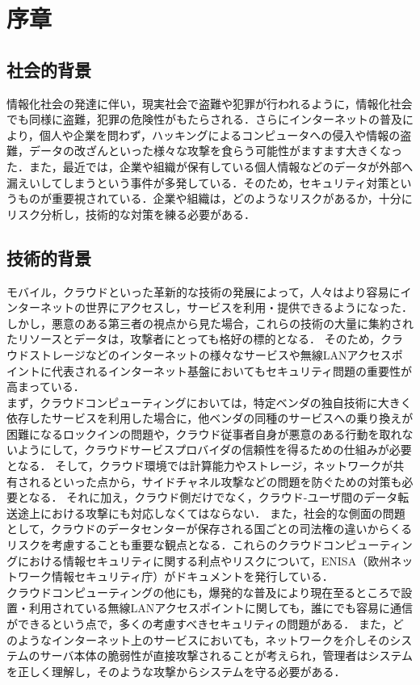 \chapter{序章}

\section{社会的背景}
情報化社会の発達に伴い，現実社会で盗難や犯罪が行われるように，情報化社会でも同様に盗難，犯罪の危険性がもたらされる．さらにインターネットの普及により，個人や企業を問わず，ハッキングによるコンピュータへの侵入や情報の盗難，データの改ざんといった様々な攻撃を食らう可能性がますます大きくなった．また，最近では，企業や組織が保有している個人情報などのデータが外部へ漏えいしてしまうという事件が多発している．そのため，セキュリティ対策というものが重要視されている．企業や組織は，どのようなリスクがあるか，十分にリスク分析し，技術的な対策を練る必要がある．

\section{技術的背景}
モバイル，クラウドといった革新的な技術の発展によって，人々はより容易にインターネットの世界にアクセスし，サービスを利用・提供できるようになった．
しかし，悪意のある第三者の視点から見た場合，これらの技術の大量に集約されたリソースとデータは，攻撃者にとっても格好の標的となる．
そのため，クラウドストレージなどのインターネットの様々なサービスや無線LANアクセスポイントに代表されるインターネット基盤においてもセキュリティ問題の重要性が高まっている．\\
まず，クラウドコンピューティングにおいては，特定ベンダの独自技術に大きく依存したサービスを利用した場合に，他ベンダの同種のサービスへの乗り換えが困難になるロックインの問題や，クラウド従事者自身が悪意のある行動を取れないようにして，クラウドサービスプロバイダの信頼性を得るための仕組みが必要となる．
そして，クラウド環境では計算能力やストレージ，ネットワークが共有されるといった点から，サイドチャネル攻撃などの問題を防ぐための対策も必要となる．
それに加え，クラウド側だけでなく，クラウド-ユーザ間のデータ転送途上における攻撃にも対応しなくてはならない．
また，社会的な側面の問題として，クラウドのデータセンターが保存される国ごとの司法権の違いからくるリスクを考慮することも重要な観点となる．これらのクラウドコンピューティングにおける情報セキュリティに関する利点やリスクについて，ENISA（欧州ネットワーク情報セキュリティ庁）がドキュメント\cite{cloudrisk}を発行している．\\
クラウドコンピューティングの他にも，爆発的な普及により現在至るところで設置・利用されている無線LANアクセスポイントに関しても，誰にでも容易に通信ができるという点で，多くの考慮すべきセキュリティの問題がある．
また，どのようなインターネット上のサービスにおいても，ネットワークを介しそのシステムのサーバ本体の脆弱性が直接攻撃されることが考えられ，管理者はシステムを正しく理解し，そのような攻撃からシステムを守る必要がある．

